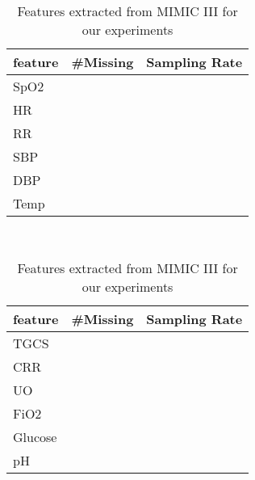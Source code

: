 \documentclass{article} \usepackage{iclr2019_conference,times}
\begin{document}
\begin{table}[h]
\centering
\caption{Features extracted from MIMIC III for our experiments}
\label{table:mis}
\begin{tabular}[h]{l c c}
                
                 \toprule
                 {feature} & {\#Missing} & {Sampling Rate}\\
                    \midrule
                    SpO2 &  & \\
                    HR  &  & \\
                    RR &   & \\
                    SBP &  & \\
                    DBP &  & \\
                    Temp & & \\
  
                    \bottomrule
                    \end{tabular}  
                    \,\,\,\,\,\,
\begin{tabular}[h]{l c c}
                 \toprule
                 {feature} & {\#Missing} & {Sampling Rate}\\
                    \midrule
                    TGCS & & \\
                    CRR && \\
                    UO & &\\
                    FiO2 &&\\
                    Glucose &&\\
                    pH &&\\
                    \bottomrule
                    \end{tabular}
\end{table}
\end{document}

